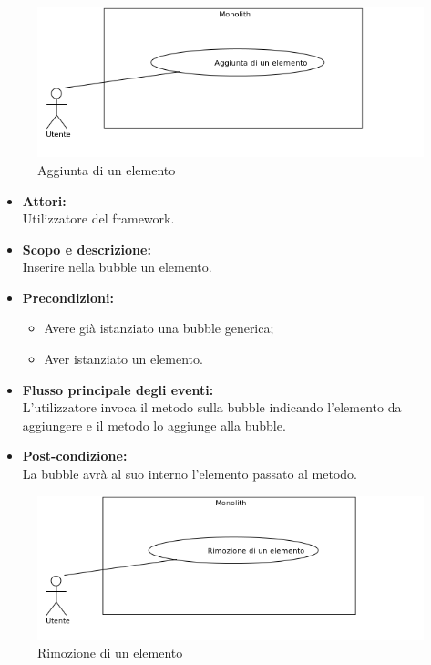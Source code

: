 \begin{samepage}
\nopagebreak
\begin{figure}[H]
	\centering
	\includegraphics[width=15cm]{../../documenti/AnalisiDeiRequisiti/Diagrammi_img/uc1_04.png}
	\caption{\UCFCaption{} Aggiunta di un elemento}
\end{figure}
\end{samepage}

\begin{itemize}
	\item \textbf{Attori:}
	\\Utilizzatore del framework.
	\item \textbf{Scopo e descrizione:} 
	\\Inserire nella bubble un elemento.
	\item \textbf{Precondizioni:}
	\begin{itemize}
		\item Avere già istanziato una bubble generica;
		\item Aver istanziato un elemento.
	\end{itemize}
	\item \textbf{Flusso principale degli eventi:}
	\\L'utilizzatore invoca il metodo sulla bubble indicando l'elemento da aggiungere e il metodo lo aggiunge alla bubble.
	\item \textbf{Post-condizione:}
	\\La bubble avrà al suo interno l'elemento passato al metodo.
\end{itemize}

\begin{samepage}
\isfirsttrue
{}
\nopagebreak
\begin{figure}[H]
	\centering
	\includegraphics[width=15cm]{../../documenti/AnalisiDeiRequisiti/Diagrammi_img/uc1_03.png}
	\caption{\UCCCaption{} Rimozione di un elemento}
\end{figure}
\end{samepage}

